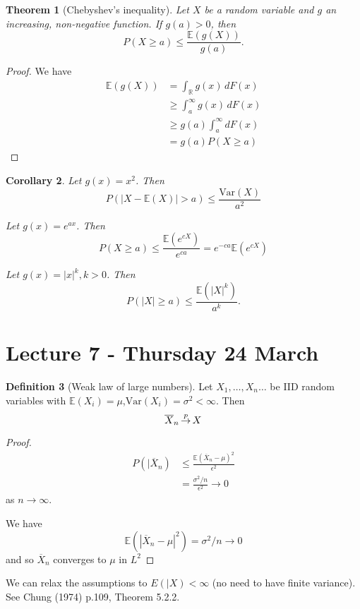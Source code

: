 \documentclass[10pt, oneside, reqno]{amsart}
\theoremstyle{plain}%
\newtheorem{thm}{Theorem}[section]
\newtheorem{cor}[thm]{Corollary}
\theoremstyle{definition}
\newtheorem{defn}[thm]{Definition}
\theoremstyle{remark}
\newcommand{\var}{\text{Var}}
\newcommand{\R}{\mathbb{R}}
\newcommand{\E}{\mathbb{E}}
\def\cip{\,{\buildrel p \over \rightarrow}\,}
\begin{document}
\begin{thm}[Chebyshev's inequality]
	Let $X$ be a random variable and $g$ an increasing, non-negative function.  If $g(a) > 0$, then $$ P(X \geq a) \leq \frac{\E(g(X))}{g(a)}.$$
\end{thm}

\begin{proof}
	We have  \begin{align*}
		\E(g(X)) &= \int_\R g(x) \, dF(x) \\
				&\geq \int_a^\infty g(x) \, dF(x) \\
				&\geq g(a) \int_a^\infty dF(x) \\
				&= g(a) P(X \geq a) 
	\end{align*}
\end{proof}

\begin{cor}
	Let $g(x) = x^2$.  Then\[
		P( | X - \E(X) | > a) \leq \frac{\text{Var}(X)}{a^2}
 	\]

	Let $g(x) = e^{ax}$.  Then \[
		P(X \geq a) \leq \frac{\E(e^{cX})}{e^{ca}} = e^{-ca} \E(e^{cX})
	\]
	
	Let $g(x) = |x|^k, k > 0$. Then \[
		P(|X| \geq a) \leq \frac{\E(|X|^k)}{a^k}.
	\]
\end{cor}

\section{Lecture 7 - Thursday 24 March} %
\label{sec:lecture_7_thursday_24_march}
\begin{defn}[Weak law of large numbers]
	Let $X_1, \dots, X_n \dots$ be IID random variables with $\E(X_i) = \mu$,$ \var(X_i) = \sigma^2 < \infty$.  Then \[
		\overline{X}_n \cip X
	\]
\end{defn}

\begin{proof}
	\begin{align*}
		P(|\overline{X}_n) &\leq \frac{\E(\overline{X}_n - \mu)^2}{\epsilon^2} \\
							&= \frac{\sigma^2/n}{\epsilon^2} \rightarrow 0
	\end{align*} as $n \rightarrow \infty$.  
	
	We have \[
		\E(|\overline{X}_n - \mu|^2) = \sigma^2/n \rightarrow 0
	\] and so $\overline{X}_n$ converges to $\mu$ in $L^2$
\end{proof}

We can relax the assumptions to $E(|X) < \infty$ (no need to have finite variance).  See Chung (1974) p.109, Theorem 5.2.2.
\end{document}
